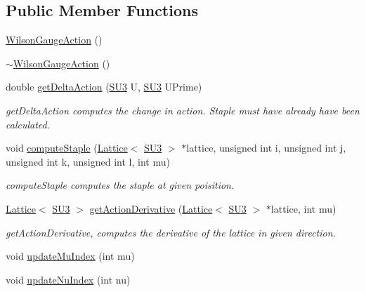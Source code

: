 \subsection*{Public Member Functions}
\begin{DoxyCompactItemize}
\item 
\mbox{\hyperlink{class_wilson_gauge_action_a50d06446cf93f7e738e88c372920f518}{Wilson\+Gauge\+Action}} ()
\item 
\mbox{\hyperlink{class_wilson_gauge_action_a0995cd407b76b4f5d035659718591c11}{$\sim$\+Wilson\+Gauge\+Action}} ()
\item 
double \mbox{\hyperlink{class_wilson_gauge_action_a60f2892e61489004df3cde6cc856b00b}{get\+Delta\+Action}} (\mbox{\hyperlink{class_s_u3}{S\+U3}} U, \mbox{\hyperlink{class_s_u3}{S\+U3}} U\+Prime)
\begin{DoxyCompactList}\small\item\em get\+Delta\+Action computes the change in action. Staple must have already have been calculated. \end{DoxyCompactList}\item 
void \mbox{\hyperlink{class_wilson_gauge_action_af1f6ba42fcc2b923dc3b37bf150bfae9}{compute\+Staple}} (\mbox{\hyperlink{class_lattice}{Lattice}}$<$ \mbox{\hyperlink{class_s_u3}{S\+U3}} $>$ $\ast$lattice, unsigned int i, unsigned int j, unsigned int k, unsigned int l, int mu)
\begin{DoxyCompactList}\small\item\em compute\+Staple computes the staple at given poisition. \end{DoxyCompactList}\item 
\mbox{\hyperlink{class_lattice}{Lattice}}$<$ \mbox{\hyperlink{class_s_u3}{S\+U3}} $>$ \mbox{\hyperlink{class_wilson_gauge_action_a43cf939cd53495b7225fbeaa8a0ff6e8}{get\+Action\+Derivative}} (\mbox{\hyperlink{class_lattice}{Lattice}}$<$ \mbox{\hyperlink{class_s_u3}{S\+U3}} $>$ $\ast$lattice, int mu)
\begin{DoxyCompactList}\small\item\em get\+Action\+Derivative, computes the derivative of the lattice in given direction. \end{DoxyCompactList}\item 
void \mbox{\hyperlink{class_wilson_gauge_action_ab7ed4ab8e475f5a188cd19ce720a5eb9}{update\+Mu\+Index}} (int mu)
\item 
void \mbox{\hyperlink{class_wilson_gauge_action_a010b3b8870476dfec4c48a01b6d6fc1d}{update\+Nu\+Index}} (int nu)
\end{DoxyCompactItemize}
